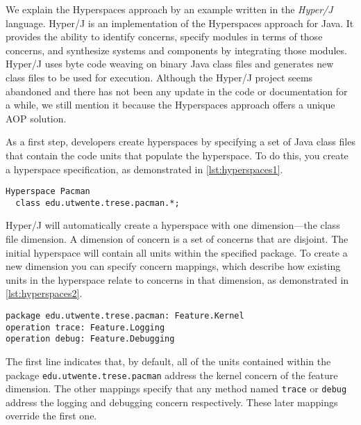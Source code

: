 We explain the Hyperspaces approach by an example written in the \emph{Hyper/J} language.
Hyper/J is an implementation of the Hyperspaces approach for Java.
It provides the ability to identify concerns, specify modules in terms of those concerns, and synthesize systems and components by integrating those modules.
Hyper/J uses byte code weaving on binary Java class files and generates new class files to be used for execution.
Although the Hyper/J project seems abandoned and there has not been any update in the code or documentation for a while, we still mention it because the Hyperspaces approach offers a unique AOP solution.

As a first step, developers create hyperspaces by specifying a set of Java class files that contain the code units that populate the hyperspace.
To do this, you create a hyperspace specification, as demonstrated in \autoref{lst:hyperspaces1}.

\begin{lstlisting}[language={[HyperJ]Java},style=floatlisting,%
                   caption={Creation of a hyperspace},label={lst:hyperspaces1},%
                   floatplacement=htbp]
Hyperspace Pacman
  class edu.utwente.trese.pacman.*;
\end{lstlisting}

Hyper/J will automatically create a hyperspace with one dimension---the class file dimension.
A dimension of concern is a set of concerns that are disjoint.
The initial hyperspace will contain all units within the specified package.
To create a new dimension you can specify concern mappings, which describe how existing units in the hyperspace relate to concerns in that dimension, as demonstrated in \autoref{lst:hyperspaces2}.

\begin{lstlisting}[language={[HyperJ]Java},style=floatlisting,%
                   caption={Specification of concern mappings},label={lst:hyperspaces2},%
                   floatplacement=htbp]
package edu.utwente.trese.pacman: Feature.Kernel
operation trace: Feature.Logging
operation debug: Feature.Debugging
\end{lstlisting}

The first line indicates that, by default, all of the units contained within the package \lstinline|edu.utwente.trese.pacman| address the kernel concern of the feature dimension.
The other mappings specify that any method named \lstinline|trace| or \lstinline|debug| address the logging and debugging concern respectively.
These later mappings override the first one.


